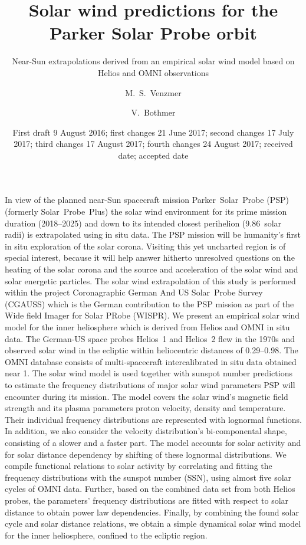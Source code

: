 
\title{Solar wind predictions for the Parker Solar Probe orbit}
\subtitle{Near-Sun extrapolations derived from an empirical solar wind model based on Helios and OMNI observations}

\author{M.~S.~Venzmer
\and V.~Bothmer}


\date{First draft 9 August 2016; first changes 21 June 2017; second changes 17 July 2017; third changes 17 August 2017; fourth changes 24 August 2017; received date; accepted date}

\abstract
{In view of the planned near-Sun spacecraft mission Parker~Solar~Probe (PSP) (formerly Solar~Probe~Plus) the solar wind environment for its prime mission duration (2018--2025) and down to its intended closest perihelion (\num{9.86}~solar radii) is extrapolated using in situ data. The PSP mission will be humanity's first in situ exploration of the solar corona. Visiting this yet uncharted region is of special interest, because it will help answer hitherto unresolved questions on the heating of the solar corona and the source and acceleration of the solar wind and solar energetic particles. The solar wind extrapolation of this study is performed within the project Coronagraphic German And US Solar~Probe Survey (CGAUSS) which is the German contribution to the PSP mission as part of the Wide field Imager for Solar PRobe (WISPR).}	%
{We present an empirical solar wind model for the inner heliosphere which is derived from Helios and OMNI in situ data. The German-US space probes Helios~1 and Helios~2 flew in the 1970s and observed solar wind in the ecliptic within heliocentric distances of \SIrange{0.29}{0.98}{\au}. The OMNI database consists of multi-spacecraft intercalibrated in situ data obtained near \SI{1}{\au}. The solar wind model is used together with sunspot number predictions to estimate the frequency distributions of major solar wind parameters PSP will encounter during its mission.}	%
{The model covers the solar wind's magnetic field strength and its plasma parameters proton velocity, density and temperature.
Their individual frequency distributions are represented with lognormal functions. In addition, we also consider the velocity distribution's bi-componental shape, consisting of a slower and a faster part. The model accounts for solar activity and for solar distance dependency by shifting of these lognormal distributions. We compile functional relations to solar activity by correlating and fitting the frequency distributions with the sunspot number (SSN), using almost five solar cycles of OMNI data. Further, based on the combined data set from both Helios probes, the parameters' frequency distributions are fitted with respect to solar distance to obtain power law dependencies. Finally, by combining the found solar cycle and solar distance relations, we obtain a simple dynamical solar wind model for the inner heliosphere, confined to the ecliptic region.}	%

